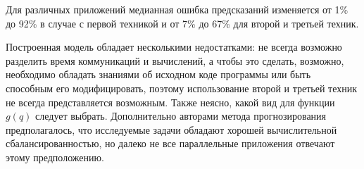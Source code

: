 
		Для различных приложений медианная ошибка предсказаний изменяется от 1\% до 92\% в случае с первой техникой и от 7\% до 67\% для второй и третьей техник.

		Построенная модель обладает несколькими недостатками: не всегда возможно разделить время коммуникаций и вычислений, а чтобы это сделать, возможно, необходимо обладать знаниями об исходном коде программы или быть способным его модифицировать, поэтому использование второй и третьей техник не всегда представляется возможным. Также неясно, какой вид для функции \(g(q)\) следует выбрать. Дополнительно авторами метода прогнозирования предполагалось, что исследуемые задачи обладают хорошей вычислительной сбалансированностью, но далеко не все параллельные приложения отвечают этому предположению.

